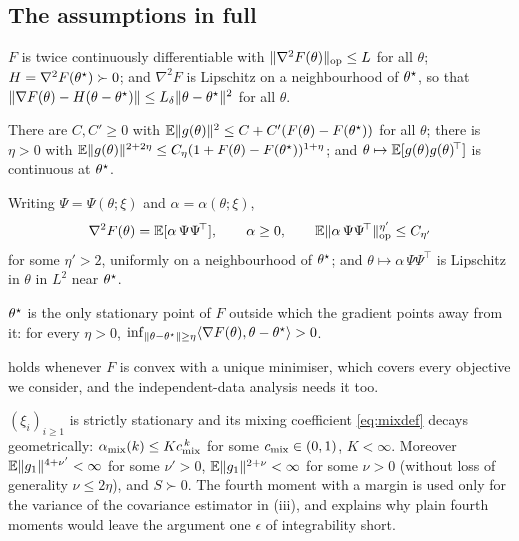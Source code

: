 
\subsection{The assumptions in full}
\label{app:assumptions}

\begin{assumption}[Regularity]
\label{as:reg}
$F$ is twice continuously differentiable with $\lVert \nabla^2F(\theta) \rVert_{\mathrm{op}}\le L$ for all
$\theta$; $H=\nabla^2F(\theta^\star)\succ0$; and $\nabla^2 F$ is Lipschitz on a neighbourhood of
$\theta^\star$, so that $\lVert \nabla F(\theta)-H(\theta-\theta^\star) \rVert\le L_\delta\lVert \theta-\theta^\star \rVert^2$ for
all $\theta$.
\end{assumption}

\begin{assumption}
\label{as:mom}
There are $C,C'\ge0$ with $\mathbb{E}\lVert g(\theta) \rVert^2\le C+C'(F(\theta)-F(\theta^\star))$ for all
$\theta$; there is $\eta>0$ with
$\mathbb{E}\lVert g(\theta) \rVert^{2+2\eta}\le C_\eta(1+F(\theta)-F(\theta^\star))^{1+\eta}$; and
$\theta\mapsto\mathbb{E}[g(\theta)g(\theta)^{\!\top}]$ is continuous at $\theta^\star$.
\end{assumption}



\begin{assumption}
\label{as:curv}
Writing $\Psi=\Psi(\theta;\xi)$ and $\alpha=\alpha(\theta;\xi)$,
\[
\nabla^2F(\theta)=\mathbb{E}[\alpha\,\Psi\Psi^{\!\top}],\qquad \alpha\ge0,
\qquad
\mathbb{E}\lVert \alpha\,\Psi\Psi^{\!\top} \rVert_{\mathrm{op}}^{\eta'}\le C_{\eta'}
\]
for some $\eta'>2$, uniformly on a neighbourhood of $\theta^\star$; and
$\theta\mapsto\alpha\,\Psi\Psi^{\!\top}$ is Lipschitz in $\theta$ in $L^2$ near $\theta^\star$.
\end{assumption}

\begin{assumption}[Identifiability]
\label{as:ident}
$\theta^\star$ is the only stationary point of $F$ outside which the gradient points away from it:
for every $\eta>0$, $\inf_{\lVert \theta-\theta^\star \rVert\ge\eta}\langle\nabla F(\theta),\theta-\theta^\star\rangle>0$.
\end{assumption}

\noindent
{} holds whenever $F$ is convex with a unique minimiser, which covers every objective we
consider, and the independent-data analysis needs it too.

\begin{assumption}
\label{as:mix}
$(\xi_i)_{i\ge1}$ is strictly stationary and its mixing coefficient \eqref{eq:mixdef}
decays geometrically: $\alpha_{\mathrm{mix}}(k)\le Kc_{\mathrm{mix}}^{\,k}$ for some $c_{\mathrm{mix}}\in(0,1)$,
$K<\infty$. Moreover $\mathbb{E}\lVert g_1 \rVert^{4+\nu'}<\infty$ for some $\nu'>0$,
$\mathbb{E}\lVert g_1 \rVert^{2+\nu}<\infty$ for some $\nu>0$ (without loss of generality $\nu\le2\eta$), and
$S\succ0$. The fourth moment with a margin is used only for the variance of the covariance estimator in
(iii), and  explains why plain fourth moments would leave the
argument one $\epsilon$ of integrability short.
\end{assumption}

